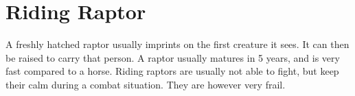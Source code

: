 \section{Riding Raptor}

A freshly hatched raptor usually imprints on the first creature it sees. It can then be raised to carry that person. A raptor usually matures in 5 years, and is very fast compared to a horse. Riding raptors are usually not able to fight, but keep their calm during a combat situation. They are however very frail.